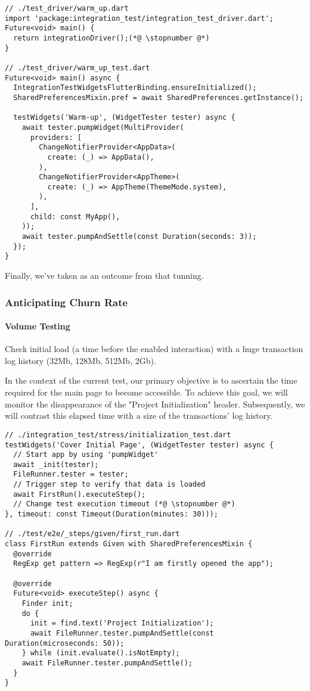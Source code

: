 \begin{lstlisting}
// ./test_driver/warm_up.dart
import 'package:integration_test/integration_test_driver.dart';
Future<void> main() {
  return integrationDriver();(*@ \stopnumber @*)
}

// ./test_driver/warm_up_test.dart
Future<void> main() async {
  IntegrationTestWidgetsFlutterBinding.ensureInitialized();
  SharedPreferencesMixin.pref = await SharedPreferences.getInstance();

  testWidgets('Warm-up', (WidgetTester tester) async {
    await tester.pumpWidget(MultiProvider(
      providers: [
        ChangeNotifierProvider<AppData>(
          create: (_) => AppData(),
        ),
        ChangeNotifierProvider<AppTheme>(
          create: (_) => AppTheme(ThemeMode.system),
        ),
      ],
      child: const MyApp(),
    ));
    await tester.pumpAndSettle(const Duration(seconds: 3));
  });
}
\end{lstlisting}

\noindent Finally, we've taken  as an outcome from that tunning.

\subsubsection{Anticipating Churn Rate}
\paragraph{Volume Testing}
Check initial load (a time before the enabled interaction) with a huge transaction log history (32Mb, 128Mb, 
512Mb, 2Gb).

In the context of the current test, our primary objective is to ascertain the time required for the main page to 
become accessible. To achieve this goal, we will monitor the disappearance of the "Project Initialization" header. 
Subsequently, we will contrast this elapsed time with a size of the transactions' log history.

\begin{lstlisting}
// ./integration_test/stress/initialization_test.dart
testWidgets('Cover Initial Page', (WidgetTester tester) async {
  // Start app by using 'pumpWidget'
  await _init(tester);
  FileRunner.tester = tester;
  // Trigger step to verify that data is loaded
  await FirstRun().executeStep();
  // Change test execution timeout (*@ \stopnumber @*)
}, timeout: const Timeout(Duration(minutes: 30)));

// ./test/e2e/_steps/given/first_run.dart
class FirstRun extends Given with SharedPreferencesMixin {
  @override
  RegExp get pattern => RegExp(r"I am firstly opened the app");

  @override
  Future<void> executeStep() async {
    Finder init;
    do {
      init = find.text('Project Initialization');
      await FileRunner.tester.pumpAndSettle(const Duration(microseconds: 50));
    } while (init.evaluate().isNotEmpty);
    await FileRunner.tester.pumpAndSettle();
  }
}
\end{lstlisting}

